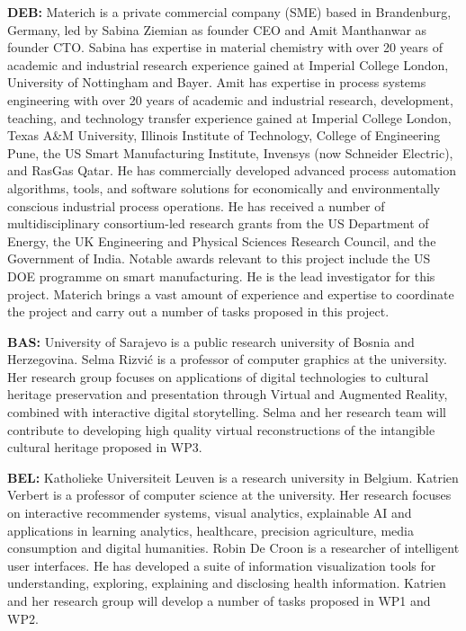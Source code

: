 \item \textbf{DEB:} Materich is a private commercial company (SME) based in Brandenburg, Germany, led by Sabina Ziemian as founder CEO and Amit Manthanwar as founder CTO. Sabina has expertise in material chemistry with over 20 years of academic and industrial research experience gained at Imperial College London, University of Nottingham and Bayer. Amit has expertise in process systems engineering with over 20 years of academic and industrial research, development, teaching, and technology transfer experience gained at  Imperial College London, Texas A\&M University, Illinois Institute of Technology, College of Engineering Pune, the US Smart Manufacturing Institute, Invensys (now Schneider Electric), and RasGas Qatar. He has commercially developed advanced process automation algorithms, tools, and software solutions for economically and environmentally conscious industrial process operations. He has received a number of multidisciplinary consortium-led research grants from the US Department of Energy, the UK Engineering and Physical Sciences Research Council, and the Government of India. Notable awards relevant to this project include the US DOE programme on smart manufacturing. He is the lead investigator for this project. Materich brings a vast amount of experience and expertise to coordinate the project and carry out a number of tasks proposed in this project.

\item \textbf{BAS:} University of Sarajevo is a public research university of Bosnia and Herzegovina. Selma Rizvić is a professor of computer graphics at the university. Her research group focuses on applications of digital technologies to cultural heritage preservation and presentation through Virtual and Augmented Reality, combined with interactive digital storytelling. Selma and her research team will contribute to developing high quality virtual reconstructions of the intangible cultural heritage proposed in WP3.

\item \textbf{BEL:} Katholieke Universiteit Leuven is a research university in Belgium. Katrien Verbert is a professor of computer science at the university. Her research focuses on interactive recommender systems,  visual analytics, explainable AI and applications in learning analytics, healthcare, precision agriculture, media consumption and digital humanities. Robin De Croon is a researcher of intelligent user interfaces. He has developed a suite of information visualization tools for understanding, exploring, explaining and disclosing health information. Katrien and her research group will develop a number of tasks proposed in WP1 and WP2.

